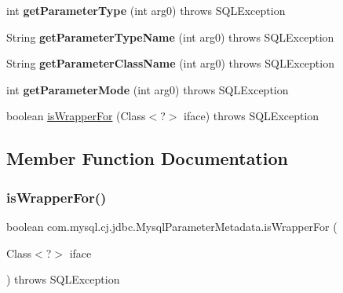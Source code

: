\begin{DoxyCompactItemize}
int {\bfseries get\+Parameter\+Type} (int arg0)  throws S\+Q\+L\+Exception 
\item 
\mbox{\label{classcom_1_1mysql_1_1cj_1_1jdbc_1_1_mysql_parameter_metadata_a5c0afbc2c6faa46b8e58fb585038edcd}} 
String {\bfseries get\+Parameter\+Type\+Name} (int arg0)  throws S\+Q\+L\+Exception 
\item 
\mbox{\label{classcom_1_1mysql_1_1cj_1_1jdbc_1_1_mysql_parameter_metadata_aea703d8ae2b53aaf5d19a029c645f12b}} 
String {\bfseries get\+Parameter\+Class\+Name} (int arg0)  throws S\+Q\+L\+Exception 
\item 
\mbox{\label{classcom_1_1mysql_1_1cj_1_1jdbc_1_1_mysql_parameter_metadata_aab903f6923b0d4a9653e01acbbc7d520}} 
int {\bfseries get\+Parameter\+Mode} (int arg0)  throws S\+Q\+L\+Exception 
\item 
boolean \mbox{\hyperlink{classcom_1_1mysql_1_1cj_1_1jdbc_1_1_mysql_parameter_metadata_a196a5bb16a36dd89fe72d5b46db15b0e}{is\+Wrapper\+For}} (Class$<$?$>$ iface)  throws S\+Q\+L\+Exception 
\end{DoxyCompactItemize}


\subsection{Member Function Documentation}
\mbox{\label{classcom_1_1mysql_1_1cj_1_1jdbc_1_1_mysql_parameter_metadata_a196a5bb16a36dd89fe72d5b46db15b0e}} 
\subsubsection{\texorpdfstring{is\+Wrapper\+For()}{isWrapperFor()}}
{\footnotesize\ttfamily boolean com.\+mysql.\+cj.\+jdbc.\+Mysql\+Parameter\+Metadata.\+is\+Wrapper\+For (\begin{DoxyParamCaption}\item[{Class$<$?$>$}]{iface }\end{DoxyParamCaption}) throws S\+Q\+L\+Exception}

